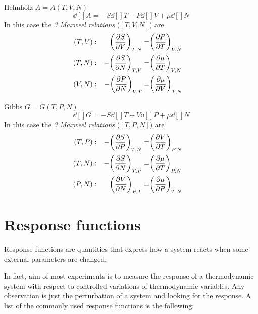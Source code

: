 \documentclass[../../Main/Main.tex]{subfiles}
\begin{document}
\begin{example}{Helmholz \( A=A(T,V,N) \)}{}
\begin{equation}
  \dd[]{A} = - S \dd[]{T} - P \dd[]{V} + \mu \dd[]{N}
\end{equation}
In this case the \emph{3 Maxweel relations} (\( [T,V,N] \)) are
\begin{subequations}
\begin{align}
  (T,V) &:& \qty(\pdv{S}{V} )_{T,N} =&  \qty(\pdv{P}{T} )_{V,N} & \\
  (T,N) &:& -\qty(\pdv{S}{N} )_{T,V} =& \qty(\pdv{\mu }{T} )_{V,N} &\\
  (V,N) &:& -\qty(\pdv{P}{N} )_{V,T} =& \qty(\pdv{\mu }{V} )_{T,N} &
 \end{align}
\label{}
\end{subequations}
\end{example}
\begin{example}{Gibbs \( G=G(T,P,N) \) }{}
  \begin{equation}
    \dd[]{G} = - S \dd[]{T} + V \dd[]{P} + \mu \dd[]{N}
  \end{equation}
  In this case the \emph{3 Maxweel relations} (\( [T,P,N] \)) are
  \begin{subequations}
  \begin{align}
    (T,P) &:& -\qty(\pdv{S}{P} )_{T,N} =&  \qty(\pdv{V}{T} )_{P,N} & \\
    (T,N) &:& -\qty(\pdv{S}{N} )_{T,P} =& \qty(\pdv{\mu }{T} )_{P,N} &\\
    (P,N) &:& \qty(\pdv{V}{N} )_{P,T} =& \qty(\pdv{\mu }{P} )_{T,N} &
   \end{align}
  \label{}
  \end{subequations}
\end{example}

\section{Response functions}
Response functions are quantities that express how a system reacts when some external parameters are changed.

In fact, aim of most experiments is to measure the response of a thermodynamic system with respect to controlled variations of thermodynamic variables. Any observation is just the perturbation of a system and looking for the response.
A list of the commonly used response functions is the following:
\end{document}

